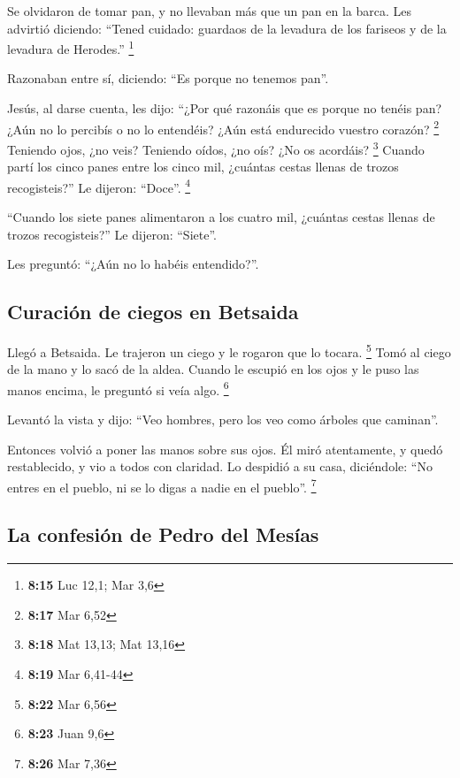 \begin{paracol}{2}
 Se olvidaron de tomar pan, y no llevaban más que un pan
en la barca.  Les advirtió diciendo: ``Tened cuidado:
guardaos de la levadura de los fariseos y de la levadura de Herodes.''
\footnote{\textbf{8:15} Luc 12,1; Mar 3,6}

 Razonaban entre sí, diciendo: ``Es porque no tenemos
pan''.

 Jesús, al darse cuenta, les dijo: ``¿Por qué razonáis
que es porque no tenéis pan? ¿Aún no lo percibís o no lo entendéis? ¿Aún
está endurecido vuestro corazón? \footnote{\textbf{8:17} Mar 6,52}
 Teniendo ojos, ¿no veis? Teniendo oídos, ¿no oís? ¿No os
acordáis? \footnote{\textbf{8:18} Mat 13,13; Mat 13,16} 
Cuando partí los cinco panes entre los cinco mil, ¿cuántas cestas llenas
de trozos recogisteis?'' Le dijeron: ``Doce''. \footnote{\textbf{8:19}
  Mar 6,41-44}

 ``Cuando los siete panes alimentaron a los cuatro mil,
¿cuántas cestas llenas de trozos recogisteis?'' Le dijeron: ``Siete''.

 Les preguntó: ``¿Aún no lo habéis entendido?''.

\hypertarget{curaciuxf3n-de-ciegos-en-betsaida}{%
\subsection{Curación de ciegos en
Betsaida}\label{curaciuxf3n-de-ciegos-en-betsaida}}

 Llegó a Betsaida. Le trajeron un ciego y le rogaron que
lo tocara. \footnote{\textbf{8:22} Mar 6,56}  Tomó al
ciego de la mano y lo sacó de la aldea. Cuando le escupió en los ojos y
le puso las manos encima, le preguntó si veía algo. \footnote{\textbf{8:23}
  Juan 9,6}

 Levantó la vista y dijo: ``Veo hombres, pero los veo
como árboles que caminan''.

 Entonces volvió a poner las manos sobre sus ojos. Él
miró atentamente, y quedó restablecido, y vio a todos con claridad.
 Lo despidió a su casa, diciéndole: ``No entres en el
pueblo, ni se lo digas a nadie en el pueblo''. \footnote{\textbf{8:26}
  Mar 7,36}

\hypertarget{la-confesiuxf3n-de-pedro-del-mesuxedas}{%
\subsection{La confesión de Pedro del
Mesías}\label{la-confesiuxf3n-de-pedro-del-mesuxedas}}


\end{paracol}
